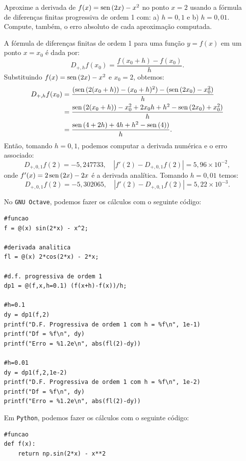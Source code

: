 \begin{exeresol}
Aproxime a derivada de $f(x)=\operatorname{sen}\,(2x) - x^2$ no ponto $x=2$ usando a fórmula de diferenças finitas progressiva de ordem 1 com: a) $h=0,1$ e b) $h=0,01$. Compute, também, o erro absoluto de cada aproximação computada.
\end{exeresol}
\begin{resol}
  A fórmula de diferenças finitas de ordem 1 para uma função $y = f(x)$ em um ponto $x = x_0$ é dada por:
  \begin{equation*}
    D_{+,h}f(x_0) = \frac{f(x_0+h) - f(x_0)}{h}.
  \end{equation*}
Substituindo $f(x) = \operatorname{sen}\,(2x) - x^2$ e $x_0 = 2$, obtemos:
  \begin{equation*}
    \begin{split}
      D_{+,h}f(x_0) &= \frac{(\operatorname{sen}\,(2(x_0+h)) - (x_0+h)^2) - (\operatorname{sen}\,(2x_0) - x_0^2)}{h}\\
      &= \frac{\operatorname{sen}\,(2(x_0+h)) - x_0^2 + 2x_0h + h^2 - \operatorname{sen}\,(2x_0) + x_0^2)}{h}\\
      &= \frac{\operatorname{sen}\,(4+2h) + 4h + h^2 - \operatorname{sen}\,(4))}{h}.
    \end{split}
  \end{equation*}
Então, tomando $h=0,1$, podemos computar a derivada numérica e o erro associado:
\begin{equation*}
  D_{+,0,1}f(2) = -5,247733,\quad |f'(2)-D_{+,0,1}f(2)| = 5,96\times 10^{-2},
\end{equation*}
onde $f'(x) = 2\operatorname{sen}\,(2x) - 2x$ é a derivada analítica. Tomando $h=0,01$ temos:
\begin{equation*}
  D_{+,0,1}f(2) = -5,302065,\quad |f'(2)-D_{+,0,1}f(2)| = 5,22\times 10^{-3}.
\end{equation*}

\ifisoctave
No \verb+GNU Octave+, podemos fazer os cálculos com o seguinte código:
\begin{verbatim}
#funcao
f = @(x) sin(2*x) - x^2;

#derivada analitica
fl = @(x) 2*cos(2*x) - 2*x;

#d.f. progressiva de ordem 1
dp1 = @(f,x,h=0.1) (f(x+h)-f(x))/h;

#h=0.1
dy = dp1(f,2)
printf("D.F. Progressiva de ordem 1 com h = %f\n", 1e-1)
printf("Df = %f\n", dy)
printf("Erro = %1.2e\n", abs(fl(2)-dy))

#h=0.01
dy = dp1(f,2,1e-2)
printf("D.F. Progressiva de ordem 1 com h = %f\n", 1e-2)
printf("Df = %f\n", dy)
printf("Erro = %1.2e\n", abs(fl(2)-dy))
\end{verbatim}
\fi
\ifispython
Em \verb+Python+, podemos fazer os cálculos com o seguinte código:
\begin{verbatim}
#funcao
def f(x):
    return np.sin(2*x) - x**2


\end{verbatim}
\end{resol}
